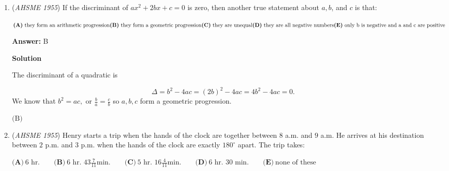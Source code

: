 \begin{enumerate}
 $\textbf{(A)}\ \frac{\sqrt{6}}{2}\qquad\textbf{(B)}\ \sqrt{2}\qquad\textbf{(C)}\ 2+\sqrt{2}\qquad\textbf{(D)}\ \frac{2+\sqrt{2}}{2}\qquad\textbf{(E)}\ \frac{2\sqrt{3}-\sqrt{6}}{2}$

 \textbf{Answer: }D



\textbf{Solution}

The area of the large equilateral triangle is $2^2*\frac{\sqrt{3}}{4}=\sqrt{3}$ square units, so the smaller triangle is $\frac{\sqrt{3}}{2}$. The side length of the smaller length $s$ is $\sqrt{\frac{4}{\sqrt{3}}*\frac{\sqrt{3}}{2}} = \sqrt{2}$. The median of the trapezoid can be determined by the average of the two bases of the trapezoids, so it works out to be $\boxed{\textbf{(D)}\frac{2+\sqrt{2}}{2}}$ units long.

 


	\item (\textit{AHSME 1955}) If the discriminant of $ax^2+2bx+c=0$ is zero, then another true statement about $a, b$, and $c$ is that: 


 $\textbf{(A)}\ \text{they form an arithmetic progression}\\ \textbf{(B)}\ \text{they form a geometric progression}\\ \textbf{(C)}\ \text{they are unequal}\\ \textbf{(D)}\ \text{they are all negative numbers}\\ \textbf{(E)}\ \text{only b is negative and a and c are positive}$

 \textbf{Answer: }B



\textbf{Solution}

The discriminant of a quadratic is

 
 \[\Delta = b^2 - 4ac = (2b)^2 - 4ac = 4b^2 - 4ac = 0.\]We know that $b^2 = ac,$ or $\frac{b}{a} = \frac{c}{b}$ so $a, b, c$ form a geometric progression.

 
$\boxed{\text{(B)}}$



	\item (\textit{AHSME 1955}) Henry starts a trip when the hands of the clock are together between $8$ a.m. and $9$ a.m. 
He arrives at his destination between $2$ p.m. and $3$ p.m. when the hands of the clock are exactly $180^\circ$ apart. The trip takes: 


 $\textbf{(A)}\ \text{6 hr.}\qquad\textbf{(B)}\ \text{6 hr.   } 43\frac{7}{11} \text{min.}\qquad\textbf{(C)}\ \text{5 hr.   } 16\frac{4}{11} \text{min.}\qquad\textbf{(D)}\ \text{6 hr. 30 min.}\qquad\textbf{(E)}\ \text{none of these}$


\end{enumerate}

